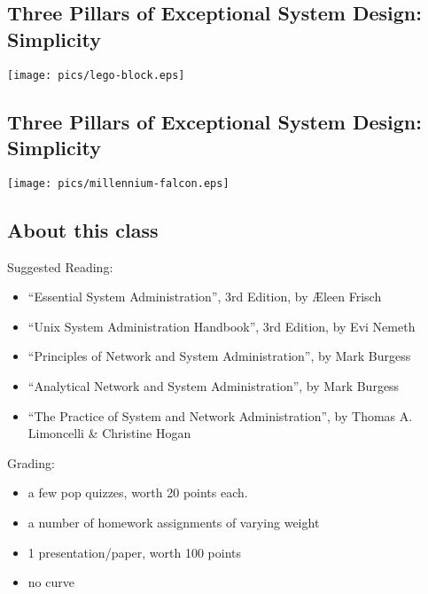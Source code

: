 \documentclass[xga]{xdvislides}
\begin{document}
\subsection{Three Pillars of Exceptional System Design: Simplicity}
\vspace*{\fill}
\begin{center}
    \texttt{[image: pics/lego-block.eps]} \\
\end{center}
\vspace*{\fill}

\subsection{Three Pillars of Exceptional System Design: Simplicity}
\vspace*{\fill}
\begin{center}
    \texttt{[image: pics/millennium-falcon.eps]} \\
\end{center}
\vspace*{\fill}







\subsection{About this class}
Suggested Reading:
\begin{itemize}
	\item ``Essential System Administration'', 3rd Edition, by \AE leen
		Frisch
	\item ``Unix System Administration Handbook'', 3rd Edition, by Evi Nemeth
	\item ``Principles of Network and System Administration'', by Mark Burgess
	\item ``Analytical Network and System Administration'', by Mark Burgess
	\item ``The Practice of System and Network Administration'', by Thomas
		A. Limoncelli \& Christine Hogan
\end{itemize}
\addvspace{.5in}
Grading:
\begin{itemize}
	\item a few pop quizzes, worth 20 points each.
	\item a number of homework assignments of varying weight
	\item 1 presentation/paper, worth 100 points
	\item no curve
\end{itemize}
\end{document}
